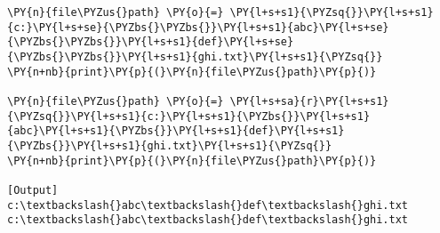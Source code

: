 \begin{Verbatim}[label=\makebox{\href{https://github.com/unipi-physics-labs/lab1-notes/tree/main/snippy/dos_path_escape_fix.py}{https://github.com/.../dos\_path\_escape\_fix.py}},commandchars=\\\{\}]
\PY{n}{file\PYZus{}path} \PY{o}{=} \PY{l+s+s1}{\PYZsq{}}\PY{l+s+s1}{c:}\PY{l+s+se}{\PYZbs{}\PYZbs{}}\PY{l+s+s1}{abc}\PY{l+s+se}{\PYZbs{}\PYZbs{}}\PY{l+s+s1}{def}\PY{l+s+se}{\PYZbs{}\PYZbs{}}\PY{l+s+s1}{ghi.txt}\PY{l+s+s1}{\PYZsq{}}
\PY{n+nb}{print}\PY{p}{(}\PY{n}{file\PYZus{}path}\PY{p}{)}

\PY{n}{file\PYZus{}path} \PY{o}{=} \PY{l+s+sa}{r}\PY{l+s+s1}{\PYZsq{}}\PY{l+s+s1}{c:}\PY{l+s+s1}{\PYZbs{}}\PY{l+s+s1}{abc}\PY{l+s+s1}{\PYZbs{}}\PY{l+s+s1}{def}\PY{l+s+s1}{\PYZbs{}}\PY{l+s+s1}{ghi.txt}\PY{l+s+s1}{\PYZsq{}}
\PY{n+nb}{print}\PY{p}{(}\PY{n}{file\PYZus{}path}\PY{p}{)}

[Output]
c:\textbackslash{}abc\textbackslash{}def\textbackslash{}ghi.txt
c:\textbackslash{}abc\textbackslash{}def\textbackslash{}ghi.txt
\end{Verbatim}
